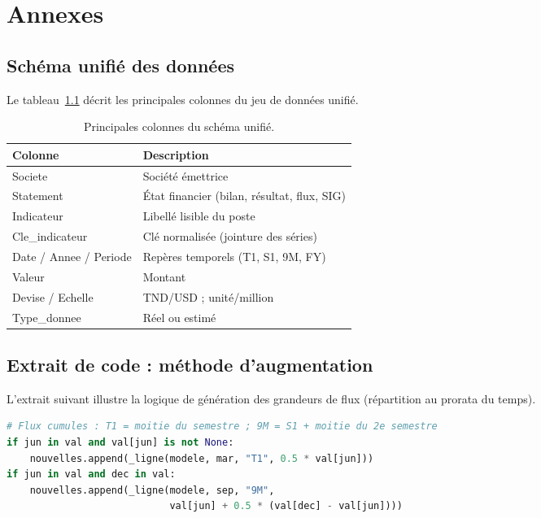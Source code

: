 \appendix
\chapter{Annexes}

\section{Schéma unifié des données}
Le tableau~\ref{tab:schema} décrit les principales colonnes du jeu de données
unifié.

\begin{table}[H]
\centering
\caption{Principales colonnes du schéma unifié.}
\label{tab:schema}
\begin{tabular}{ll}
\toprule
\textbf{Colonne} & \textbf{Description} \\
\midrule
Societe & Société émettrice \\
Statement & État financier (bilan, résultat, flux, SIG) \\
Indicateur & Libellé lisible du poste \\
Cle\_indicateur & Clé normalisée (jointure des séries) \\
Date / Annee / Periode & Repères temporels (T1, S1, 9M, FY) \\
Valeur & Montant \\
Devise / Echelle & TND/USD ; unité/million \\
Type\_donnee & Réel ou estimé \\
\bottomrule
\end{tabular}
\end{table}

\section{Extrait de code : méthode d'augmentation}
L'extrait suivant illustre la logique de génération des grandeurs de flux
(répartition au prorata du temps).

\begin{lstlisting}[language=Python,caption={Augmentation des grandeurs de flux (extrait).}]
# Flux cumules : T1 = moitie du semestre ; 9M = S1 + moitie du 2e semestre
if jun in val and val[jun] is not None:
    nouvelles.append(_ligne(modele, mar, "T1", 0.5 * val[jun]))
if jun in val and dec in val:
    nouvelles.append(_ligne(modele, sep, "9M",
                            val[jun] + 0.5 * (val[dec] - val[jun])))
\end{lstlisting}

